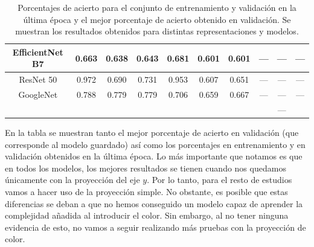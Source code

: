 \documentclass[a4paper,12pt,twoside,titlepage]{article}
\begin{document}
\begin{table}[h!]
{\begin{tabular}{cccccccccc}
  \multicolumn{1}{|c|}{EfficientNet B7}          & \multicolumn{1}{c|}{0.663} & \multicolumn{1}{c|}{0.638} & \multicolumn{1}{c|}{0.643}      & \multicolumn{1}{c|}{0.681} & \multicolumn{1}{c|}{0.601} & \multicolumn{1}{c|}{0.601}      & \multicolumn{1}{c|}{---}       & \multicolumn{1}{c|}{---}      & \multicolumn{1}{c|}{---}             \\ \hline
  \multicolumn{1}{|c|}{ResNet 50}                & \multicolumn{1}{c|}{0.972} & \multicolumn{1}{c|}{0.690} & \multicolumn{1}{c|}{0.731}      & \multicolumn{1}{c|}{0.953} & \multicolumn{1}{c|}{0.607} & \multicolumn{1}{c|}{0.651}      & \multicolumn{1}{c|}{---}       & \multicolumn{1}{c|}{---}      & \multicolumn{1}{c|}{---}             \\ \hline
  \multicolumn{1}{|c|}{GoogleNet}                & \multicolumn{1}{c|}{0.788} & \multicolumn{1}{c|}{0.779} & \multicolumn{1}{c|}{0.779}      & \multicolumn{1}{c|}{0.706} & \multicolumn{1}{c|}{0.659} & \multicolumn{1}{c|}{0.667}      & \multicolumn{1}{c|}{---}       & \multicolumn{1}{c|}{---}      & \multicolumn{1}{c|}{---}             \\ \hline
  \multicolumn{1}{l}{}                           & \multicolumn{1}{l}{}       & \multicolumn{1}{l}{}       & \multicolumn{1}{l}{}            & \multicolumn{1}{l}{}       & \multicolumn{1}{l}{}       & \multicolumn{1}{l}{}            & \multicolumn{1}{l}{}           & ---                           & \multicolumn{1}{l}{}                
  \end{tabular}
  }
  \caption{Porcentajes de acierto para el conjunto de entrenamiento y validación en la última época y el mejor porcentaje de acierto obtenido en validación. Se muestran los resultados obtenidos para distintas representaciones y modelos.}
  \label{tab:estudio_repre}
\end{table}


En la tabla se muestran tanto el mejor porcentaje de acierto en validación (que corresponde al modelo guardado) así como los porcentajes en entrenamiento y en validación obtenidos en la última época. Lo más importante que notamos es que en todos los modelos, los mejores resultados se tienen cuando nos quedamos únicamente con la proyección del eje $y$. Por lo tanto, para el resto de estudios vamos a hacer uso de la proyección simple. No obstante, es posible que estas diferencias se deban a que no hemos conseguido un modelo capaz de aprender la complejidad añadida al introducir el color. Sin embargo, al no tener ninguna evidencia de esto, no vamos a seguir realizando más pruebas con la proyección de color.   
\end{document}
